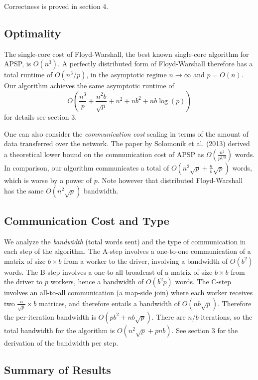 \documentclass{article} %
\begin{document}
Correctness is proved in section 4.

\subsection{Optimality}

The single-core cost of Floyd-Warshall, the best known single-core
algorithm for APSP, is $O(n^3)$.  A perfectly distributed form of
Floyd-Warshall therefore has a total runtime of $O(n^3/p)$, in the
asymptotic regime $n \to \infty$ and $p = O(n)$.  Our algorithm
achieves the same asymptotic runtime of
\[
O\left(\frac{n^3}{p} + \frac{n^2b}{\sqrt{p}} + n^2 + nb^2 + nb\log(p)\right)
\]
for details see section 3.

One can also consider the \emph{communication cost} scaling in terms
of the amount of data transferred over the network.  The paper by
Solomonik et al. (2013) derived a theoretical lower bound on the
communication cost of APSP as $\Omega(\frac{n^2}{p^{2/3}})$ words.  In
comparison, our algorithm communicates a total of $O(n^2\sqrt{p} +
\frac{n}{b}\sqrt{p})$ words, which is worse by a power of $p$.  Note
however that distributed Floyd-Warshall has the same $O(n^2\sqrt{p})$
bandwidth.

\subsection{Communication Cost and Type}

We analyze the \emph{bandwidth} (total words sent) and the type of
communication in each step of the algorithm.  The A-step involves a
one-to-one communication of a matrix of size $b \times b$ from a
worker to the driver, involving a bandwidth of $O(b^2)$ words.  The
B-step involves a one-to-all broadcast of a matrix of size $b\times b$
from the driver to $p$ workers, hence a bandwidth of $O(b^2 p)$ words.
The C-step involves an all-to-all communication (a map-side join)
where each worker receives two $\frac{n}{\sqrt{p}} \times b$ matrices, and
therefore entails a bandwidth of $O(nb\sqrt{p})$.  Therefore the
per-iteration bandwidth is $O(pb^2 + nb\sqrt{p})$.
There are $n/b$ iterations, so the total bandwidth for the algorithm
is $O(n^2\sqrt{p} + pnb)$.  See section 3 for the
derivation of the bandwidth per step.

\subsection{Summary of Results}
\end{document}
